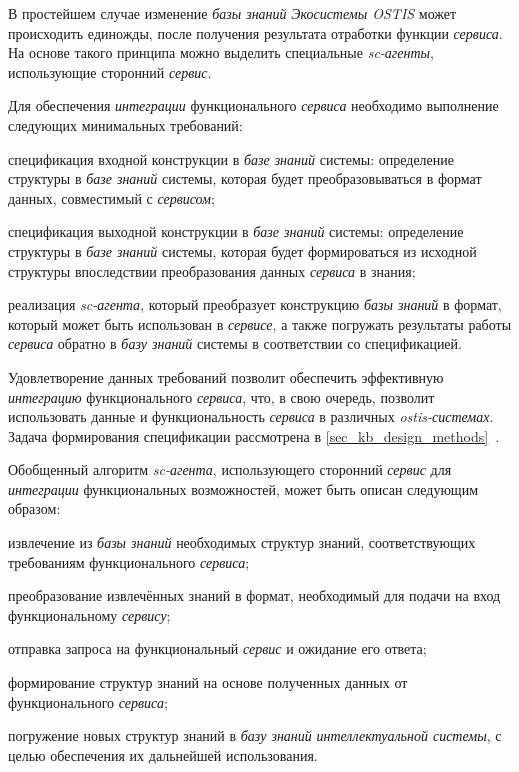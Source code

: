 В простейшем случае изменение \textit{базы знаний} \textit{Экосистемы OSTIS} может происходить единожды, после получения результата отработки функции \textit{сервиса}. На основе такого принципа можно выделить специальные \textit{sc-агенты}, использующие сторонний \textit{сервис}. 

Для обеспечения \textit{интеграции} функционального \textit{сервиса} необходимо выполнение следующих минимальных требований:
\begin{textitemize}
    \item спецификация входной конструкции в \textit{базе знаний} системы: определение структуры в \textit{базе знаний} системы, которая будет преобразовываться в формат данных, совместимый с \textit{сервисом};
    \item спецификация выходной конструкции в \textit{базе знаний} системы: определение структуры в \textit{базе знаний} системы, которая будет формироваться из исходной структуры впоследствии преобразования данных \textit{сервиса} в знания;
    \item реализация \textit{sc-агента}, который преобразует конструкцию \textit{базы знаний} в формат, который может быть использован в \textit{сервисе}, а также погружать результаты работы \textit{сервиса} обратно в \textit{базу знаний} системы в соответствии со спецификацией.
\end{textitemize}

Удовлетворение данных требований позволит обеспечить эффективную \textit{интеграцию} функционального \textit{сервиса}, что, в свою очередь, позволит использовать данные и функциональность \textit{сервиса} в различных \textit{ostis-системах}. Задача формирования спецификации рассмотрена в \ref{sec_kb_design_methods}~.

Обобщенный алгоритм \textit{sc-агента}, использующего сторонний \textit{сервис} для \textit{интеграции} функциональных возможностей, может быть описан следующим образом:

\begin{textitemize}
    \item извлечение из \textit{базы знаний} необходимых структур знаний, соответствующих требованиям функционального \textit{сервиса};
    \item преобразование извлечённых знаний в формат, необходимый для подачи на вход функциональному \textit{сервису};
    \item отправка запроса на функциональный \textit{сервис} и ожидание его ответа;
    \item формирование структур знаний на основе полученных данных от функционального \textit{сервиса};
    \item погружение новых структур знаний в \textit{базу знаний} \textit{интеллектуальной системы}, с целью обеспечения их дальнейшей использования.
\end{textitemize}

